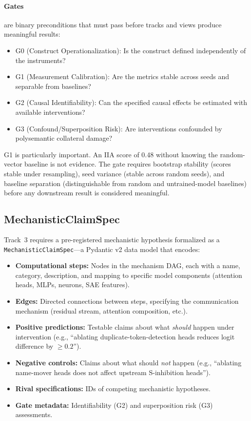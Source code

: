 \documentclass[10pt]{article}
\newcommand{\eg}{e.g.}
\begin{document}
\paragraph{Gates} are binary preconditions that must pass before tracks and views produce meaningful results:
\begin{itemize}[nosep]
    \item G0 (Construct Operationalization): Is the construct defined independently of the instruments?
    \item G1 (Measurement Calibration): Are the metrics stable across seeds and separable from baselines?
    \item G2 (Causal Identifiability): Can the specified causal effects be estimated with available interventions?
    \item G3 (Confound/Superposition Risk): Are interventions confounded by polysemantic collateral damage?
\end{itemize}

G1 is particularly important. An IIA score of 0.48 without knowing the random-vector baseline is not evidence. The gate requires bootstrap stability (scores stable under resampling), seed variance (stable across random seeds), and baseline separation (distinguishable from random and untrained-model baselines) before any downstream result is considered meaningful.

\subsection{MechanisticClaimSpec}
\label{sec:claimspec}

Track~3 requires a pre-registered mechanistic hypothesis formalized as a \texttt{MechanisticClaimSpec}---a Pydantic v2 data model that encodes:

\begin{itemize}[nosep]
    \item \textbf{Computational steps:} Nodes in the mechanism DAG, each with a name, category, description, and mapping to specific model components (attention heads, MLPs, neurons, SAE features).
    \item \textbf{Edges:} Directed connections between steps, specifying the communication mechanism (residual stream, attention composition, etc.).
    \item \textbf{Positive predictions:} Testable claims about what \emph{should} happen under intervention (\eg, ``ablating duplicate-token-detection heads reduces logit difference by $\geq 0.2$'').
    \item \textbf{Negative controls:} Claims about what should \emph{not} happen (\eg, ``ablating name-mover heads does not affect upstream S-inhibition heads'').
    \item \textbf{Rival specifications:} IDs of competing mechanistic hypotheses.
    \item \textbf{Gate metadata:} Identifiability (G2) and superposition risk (G3) assessments.
\end{itemize}
\end{document}
